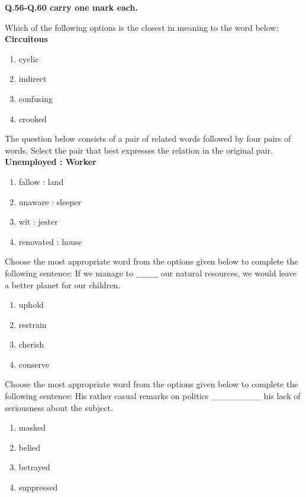 \bigskip
\textbf{Q.56-Q.60 carry one mark each.}
\bigskip
\item[56)] Which of the following options is the closest in meaning to the word below:  
\textbf{Circuitous}
\begin{enumerate}
    \item cyclic
    \item indirect
    \item confusing
    \item crooked
\end{enumerate}
\item[57)] The question below consists of a pair of related words followed by four pairs of words. Select the pair that best expresses the relation in the original pair.  
\textbf{Unemployed : Worker}
\begin{enumerate}
    \item fallow : land
    \item unaware : sleeper
    \item wit : jester
    \item renovated : house
\end{enumerate}
\item[58)] Choose the most appropriate word from the options given below to complete the following sentence:  
If we manage to $\_\_\_\_\_\_\_\_$ our natural resources, we would leave a better planet for our children.
\begin{multicols}{2}
\begin{enumerate}
    \item uphold
    \item restrain
    \item cherish
    \item conserve
\end{enumerate}
\end{multicols}
\item[59)] Choose the most appropriate word from the options given below to complete the following sentence:  
His rather casual remarks on politics \_\_\_\_\_\_\_\_ his lack of seriousness about the subject.
\begin{multicols}{2}
\begin{enumerate}
   \item masked
    \item belied
    \item betrayed
    \item suppressed
\end{enumerate}    
\end{multicols}
